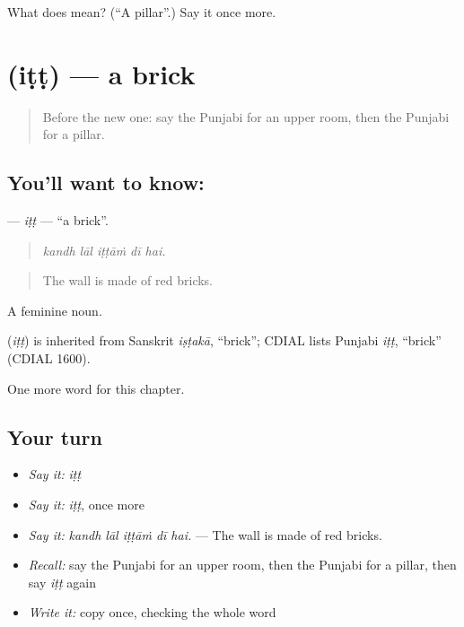\begin{tcolorbox}[breakable,colback=teal!4,colframe=teal!35!black,title={Before you move on}]
What does  mean? (\textquotedblleft{}A pillar\textquotedblright{}.) Say it once more.
\end{tcolorbox}
\section[\texorpdfstring{\pa{ਇੱਟ} (iṭṭ)}{ਇੱਟ (iṭṭ)}]{ (iṭṭ) — a brick}

\label{lesson:PA-C245-itt}



\begin{quote}
Before the new one: say the Punjabi for an upper room, then the Punjabi for a pillar.
\end{quote}

\subsection*{You'll want to know: }
\textbf{} — \emph{iṭṭ} — \textquotedblleft{}a brick\textquotedblright{}.

\begin{quote}
    
\end{quote}

\begin{quote}
\emph{kandh lāl iṭṭāṁ dī hai.}
\end{quote}

\begin{quote}
The wall is made of red bricks.
\end{quote}

A feminine noun.

\begin{cousinweb}
\textbf{} (\emph{iṭṭ}) is inherited from Sanskrit \emph{iṣṭakā}, \textquotedblleft{}brick\textquotedblright{}; CDIAL lists Punjabi \emph{iṭṭ}, \textquotedblleft{}brick\textquotedblright{} (CDIAL 1600).
\end{cousinweb}

\begin{grammarlens}[title={What you've built}]
One more word for this chapter.
\end{grammarlens}

\subsection*{Your turn}
\begin{itemize}
\raggedright
  \item \emph{Say it:} \emph{iṭṭ}
  \item \emph{Say it:} \emph{iṭṭ}, once more
  \item \emph{Say it:} \emph{kandh lāl iṭṭāṁ dī hai.} — The wall is made of red bricks.
  \item \emph{Recall:} say the Punjabi for an upper room, then the Punjabi for a pillar, then say \emph{iṭṭ} again
  \item \emph{Write it:} copy \textbf{} once, checking the whole word
\end{itemize}

